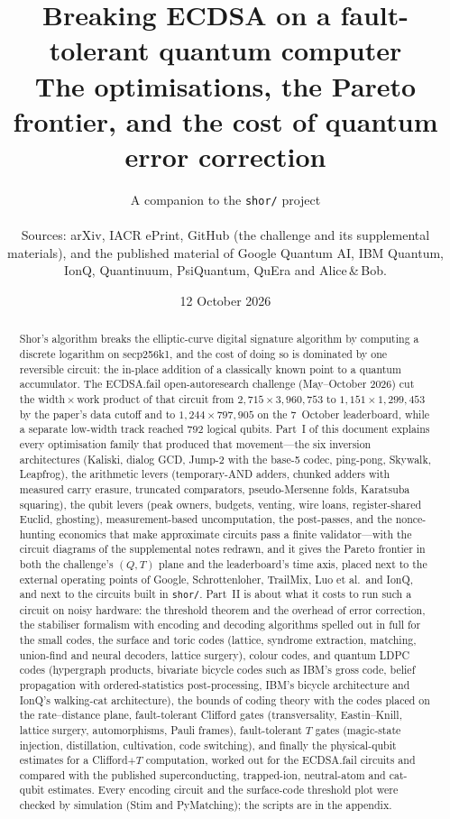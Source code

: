 \documentclass[11pt,a4paper]{article}
\title{\bfseries Breaking ECDSA on a fault-tolerant quantum computer\\[4pt]
\large The \ecdsafail{} optimisations, the Pareto frontier, and the cost of quantum error correction}
\author{A companion to the \texttt{shor/} project\\[4pt]
\parbox{0.85\textwidth}{\centering\small Sources: arXiv, IACR ePrint, GitHub (the \ecdsafail{} challenge and its supplemental materials), and the published material of Google Quantum AI, IBM Quantum, IonQ, Quantinuum, PsiQuantum, QuEra and Alice\,\&\,Bob.}}
\date{12 October 2026}
\newcommand{\ecdsafail}{ECDSA.fail}
\theoremstyle{plain}
\theoremstyle{definition}
\theoremstyle{remark}
\begin{document}
\maketitle
\vspace{-1.5em}

\begin{abstract}
\noindent
Shor's algorithm breaks the elliptic-curve digital signature algorithm by computing a discrete logarithm on secp256k1, and the cost of doing so is dominated by one reversible circuit: the in-place addition of a classically known point to a quantum accumulator. The \ecdsafail{} open-autoresearch challenge (May--October 2026) cut the width\,$\times$\,work product of that circuit from $2{,}715\times 3{,}960{,}753$ to $1{,}151\times 1{,}299{,}453$ by the paper's data cutoff and to $1{,}244\times 797{,}905$ on the 7~October leaderboard, while a separate low-width track reached $792$ logical qubits. Part~I of this document explains every optimisation family that produced that movement---the six inversion architectures (Kaliski, dialog GCD, Jump-2 with the base-5 codec, ping-pong, Skywalk, Leapfrog), the arithmetic levers (temporary-AND adders, chunked adders with measured carry erasure, truncated comparators, pseudo-Mersenne folds, Karatsuba squaring), the qubit levers (peak owners, budgets, venting, wire loans, register-shared Euclid, ghosting), measurement-based uncomputation, the post-passes, and the nonce-hunting economics that make approximate circuits pass a finite validator---with the circuit diagrams of the supplemental notes redrawn, and it gives the Pareto frontier in both the challenge's $(Q,T)$ plane and the leaderboard's time axis, placed next to the external operating points of Google, Schrottenloher, TrailMix, Luo et al.\ and IonQ, and next to the circuits built in \texttt{shor/}. Part~II is about what it costs to run such a circuit on noisy hardware: the threshold theorem and the overhead of error correction, the stabiliser formalism with encoding and decoding algorithms spelled out in full for the small codes, the surface and toric codes (lattice, syndrome extraction, matching, union-find and neural decoders, lattice surgery), colour codes, and quantum LDPC codes (hypergraph products, bivariate bicycle codes such as IBM's gross code, belief propagation with ordered-statistics post-processing, IBM's bicycle architecture and IonQ's walking-cat architecture), the bounds of coding theory with the codes placed on the rate--distance plane, fault-tolerant Clifford gates (transversality, Eastin--Knill, lattice surgery, automorphisms, Pauli frames), fault-tolerant $T$ gates (magic-state injection, distillation, cultivation, code switching), and finally the physical-qubit estimates for a Clifford$+T$ computation, worked out for the \ecdsafail{} circuits and compared with the published superconducting, trapped-ion, neutral-atom and cat-qubit estimates. Every encoding circuit and the surface-code threshold plot were checked by simulation (Stim and PyMatching); the scripts are in the appendix.
\end{abstract}
\end{document}
